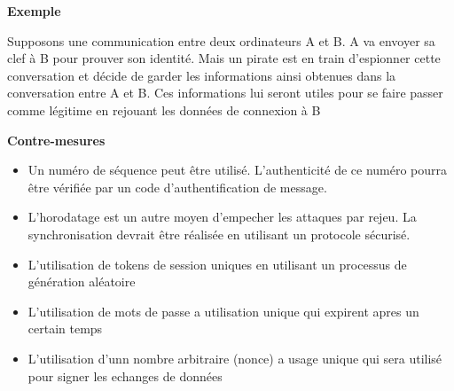 \bigskip

\begin{flushleft}
\textbf{Exemple}
\end{flushleft}

\smallskip

\begin{flushleft}
Supposons une communication entre deux ordinateurs A et B. A va envoyer sa clef à B pour prouver son identité. Mais un pirate est en train d'espionner cette conversation et décide de garder les informations ainsi obtenues dans la conversation entre A et B. Ces informations lui seront utiles pour se faire passer comme légitime en rejouant les données de connexion à B
\end{flushleft}

\bigskip


\begin{flushleft}
\textbf{Contre-mesures}
\end{flushleft}

\smallskip

\begin{itemize}
\item Un numéro de séquence peut être utilisé. L'authenticité de ce numéro pourra être vérifiée par un code d'authentification de message.
\item L'horodatage est un autre moyen d'empecher les attaques par rejeu. La synchronisation devrait être réalisée en utilisant un protocole sécurisé.
\item L'utilisation de tokens de session uniques en utilisant un processus de génération aléatoire
\item L'utilisation de mots de passe a utilisation unique qui expirent apres un certain temps
\item L'utilisation d'unn nombre arbitraire (nonce) a usage unique qui sera utilisé pour signer les echanges de données
\end{itemize}

\endinput
